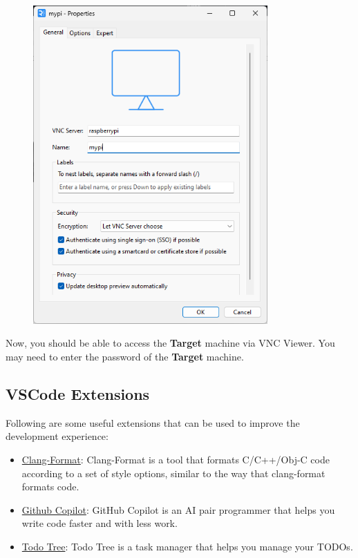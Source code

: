 \begin{figure}[H]
      \centering
      \includegraphics[width=0.8\textwidth]{texs/chapter1/image/vnc4.png}
\end{figure}

Now, you should be able to access the \textbf{Target} machine via VNC Viewer. You may need to enter the password of the \textbf{Target} machine.

\subsection{VSCode Extensions}

Following are some useful extensions that can be used to improve the development experience:

\begin{itemize}
      \item \href{https://marketplace.visualstudio.com/items?itemName=xaver.clang-format}{Clang-Format}: Clang-Format is a tool that formats C/C++/Obj-C code according to a set of style options, similar to the way that clang-format formats code.
      \item \href{https://marketplace.visualstudio.com/items?itemName=GitHub.copilot}{Github Copilot}: GitHub Copilot is an AI pair programmer that helps you write code faster and with less work.
      \item \href{https://marketplace.visualstudio.com/items?itemName=Gruntfuggly.todo-tree}{Todo Tree}: Todo Tree is a task manager that helps you manage your TODOs.
\end{itemize}

